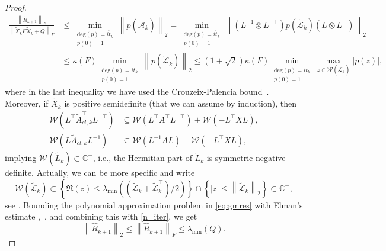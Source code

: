 \documentclass[a4paper,10pt]{article}
\newcommand{\norm}[1]{\left\lVert#1\right\rVert}
\begin{document}
\begin{proof}
 \begin{align}\label{eq:gmres}
\frac{\norm{\widehat R_{k+1}}_F}{\norm{\tilde{X}_kF\tilde{X}_k+Q}_F}&\le \min_{\begin{smallmatrix}\mathrm{deg}(p)=\overline{it}_k\\ p(0)=1\end{smallmatrix}}\norm{p(\tilde{\mathcal A}_k)}_2 = \min_{\begin{smallmatrix}\mathrm{deg}(p)=\overline{it}_k\\ p(0)=1\end{smallmatrix}}\norm{ (L^{-1}\otimes L^{-\top})p(\tilde{\mathcal L}_k) (L \otimes L^{\top})}_2 \nonumber\\
&\le \kappa(F) \min_{\begin{smallmatrix}\mathrm{deg}(p)=\overline{it}_k\\ p(0)=1\end{smallmatrix}}\norm{p(\tilde{\mathcal L}_k)}_2\le (1+\sqrt{2})\kappa(F) \min_{\begin{smallmatrix}\mathrm{deg}(p)=\overline{it}_k\\ p(0)=1\end{smallmatrix}}\max_{z\in\mathcal W(\tilde{\mathcal L}_k)}|p(z)|,
\end{align}
where in the last inequality we have used the Crouzeix-Palencia bound~\cite{crouzeix}. Moreover, if $\tilde{X}_k$ is positive semidefinite (that we can assume by induction), then  
\begin{align*}
\mathcal W\left(L^\top\tilde{A}_{cl,k}^\top L^{-\top}\right)&\subseteq \mathcal W\left(L^\top A^\top L^{-\top}\right)+\mathcal W\left(-L^\top XL\right),\\ \mathcal W\left(L\tilde{A}_{cl,k} L^{-1}\right)&\subseteq \mathcal W\left(L^{-1} AL\right)+\mathcal W\left(-L^\top XL\right),
\end{align*}
implying $\mathcal W(\tilde{L}_k)\subset\mathbb C^{-}$, i.e., the Hermitian part of $\tilde{L}_k$ is symmetric negative definite. Actually, we can be more specific and write
$$\mathcal W(\tilde{\mathcal L}_k)\subset\left\{\Re(z)\le \lambda_{\min}\left((\tilde{\mathcal L}_k+\tilde{\mathcal L}_k^\top)/2\right)\right\}\cap\left\{|z|\le \norm{\tilde{\mathcal L}_k}_2\right\}\subset\mathbb C^{-},$$ see \cite{beckerman06, embree2023}. 
 Bounding the polynomial approximation problem in \eqref{eq:gmres} with Elman's estimate \cite[Theorem 5.4]{elman1982iterative},~\cite[page 776]{beckerman06}, and combining this with \eqref{n_iter}, we get
$$
\norm{\widehat R_{k+1}}_2\le \norm{\widehat R_{k+1}}_F\le \lambda_{\min}(Q).
$$
\end{proof}
\end{document}
